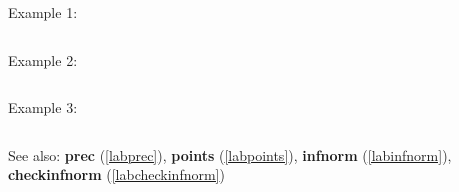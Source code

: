\noindent Example 1: 
\begin{center}\begin{minipage}{15cm}\begin{Verbatim}[frame=single]
\end{Verbatim}
\end{minipage}\end{center}
\noindent Example 2: 
\begin{center}\begin{minipage}{15cm}\begin{Verbatim}[frame=single]
\end{Verbatim}
\end{minipage}\end{center}
\noindent Example 3: 
\begin{center}\begin{minipage}{15cm}\begin{Verbatim}[frame=single]
\end{Verbatim}
\end{minipage}\end{center}
See also: \textbf{prec} (\ref{labprec}), \textbf{points} (\ref{labpoints}), \textbf{infnorm} (\ref{labinfnorm}), \textbf{checkinfnorm} (\ref{labcheckinfnorm})
